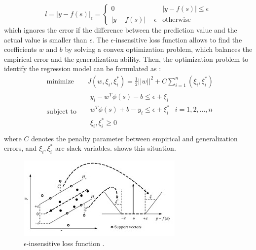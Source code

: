 \begin{equation*}
l= {\left| y - f(s) \right| }_{\epsilon } = 
\begin{cases}
   0 & {\left| y - f(s) \right| } \leq \epsilon \\
   \left| y - f(s) \right| - \epsilon & \text{otherwise}
\end{cases}
\end{equation*}
which ignores the error if the difference between the prediction value
and the actual value is smaller than $\epsilon$.
%
The $\epsilon$-insensitive loss function allows to find the
coefficients $w$ and $b$ by solving a convex optimization problem,
which balances the empirical error and the generalization ability.
%
Then, the optimization problem to identify the regression model can be
formulated as \citep{Wei2013}:
%
\begin{equation} 
\begin{aligned}
& \underset{}{\text{minimize}}
& & J(w,\xi_i , \xi_i^* ) = \frac{1}{2}   \Bigr| \Bigr| w \Bigr| \Bigr|^2 + C \sum_{i=1}^{n} (\xi_i , \xi_i^* )    \\
& \text{subject to}
& & \begin{array}{lcl} 
y_i - w^T \phi (s) - b  \leq \epsilon + \xi_i   \\
w^T \phi (s) + b - y_i \leq \epsilon + \xi_i^* & i= 1,2,...,n \\
\xi_i , \xi_i^* \geq 0  \\
\end{array}
\end{aligned}
\end{equation}  
where $C$ denotes the penalty parameter between empirical and
generalization errors, and $\xi_i , \xi_i^*$ are slack
variables.  shows this situation.

\begin{figure}[h] 
 \centering
 \includegraphics[scale=.9]{SVR}
 \caption{$\epsilon$-insensitive loss function \citep{Wei2013}.} 
 \label{figura2} 
\end{figure}
 

